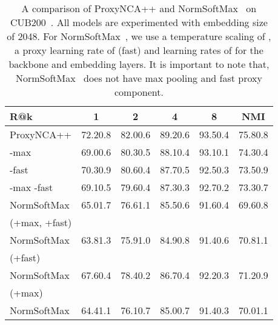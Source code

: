 \documentclass[runningheads]{llncs}
\begin{document}
\begin{table}[htb]
\centering
\caption{A comparison of ProxyNCA++ and NormSoftMax~\cite{zhai2019} on CUB200~\cite{wah2011caltech}.  All models are experimented with embedding size of 2048. For NormSoftMax~\cite{Zheng_2019_CVPR}, we use a temperature scaling of , a proxy learning rate of  (fast) and learning rates of  for the backbone and embedding layers. It is important to note that, NormSoftMax~\cite{zhai2019}  does not have max pooling and fast proxy component. }
\setlength{\tabcolsep}{3pt}
\begin{tabular}{|l|*5c|}
\hline
R@k & 1 & 2 & 4 & 8 & NMI \\
\hline
\small{ProxyNCA++} & 72.20.8 & 82.00.6 & 89.20.6 & 93.50.4 & 75.80.8 \\
\hspace{0.3cm}\small{-max}& 69.00.6 & 80.30.5 & 88.10.4 & 93.10.1 & 74.30.4 \\
\hspace{0.3cm}\small{-fast}& 70.30.9 & 80.60.4 & 87.70.5 & 92.50.3 & 73.50.9 \\
\hspace{0.3cm}\small{-max -fast}& 69.10.5 & 79.60.4 & 87.30.3 & 92.70.2 & 73.30.7\\
\hline
\small{NormSoftMax} & 65.01.7 & 76.61.1 & 85.50.6 & 91.60.4 & 69.60.8 \\
\small{(+max, +fast)}& & & & &\\
\small{NormSoftMax} & 63.81.3 & 75.91.0 & 84.90.8 & 91.40.6 & 70.81.1 \\
\small{(+fast)}& & & & &\\
\small{NormSoftMax} & 67.60.4 & 78.40.2 & 86.70.4 & 92.20.3 & 71.20.9 \\
\small{(+max)}& & & & &\\
\small{NormSoftMax} & 64.41.1 & 76.10.7 & 85.00.7 & 91.40.3 & 70.01.1 \\
\hline
\end{tabular}
\label{table:cub_nsm}
\end{table}
\end{document}
